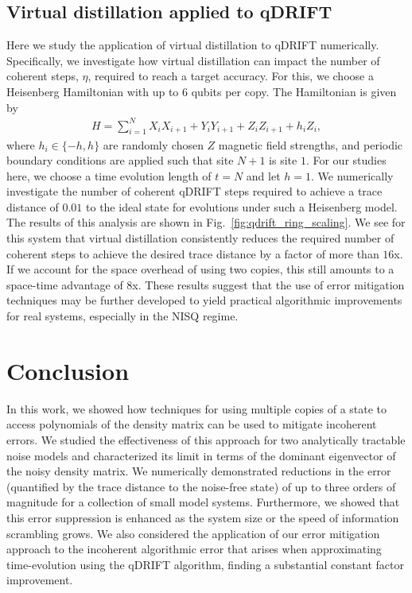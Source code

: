 \documentclass[
amsmath,
amssymb,
aps,
pra,
reprint,
twocolumn,
superscriptaddress,
longbibliography,
showkeys,
floatfix
]{revtex4-1}
\begin{document}
\subsection{Virtual distillation applied to qDRIFT}\label{sec:qDRIFT}
Here we study the application of virtual distillation to qDRIFT numerically. 
Specifically, we investigate how virtual distillation can impact the number of
coherent steps, $\eta$, required to reach a target accuracy. 
For this, we choose a Heisenberg Hamiltonian with up to 6 qubits per copy. 
The Hamiltonian is given by
\begin{align}
  H = \sum_{i=1}^{N} X_i X_{i+1} + Y_i Y_{i+1} + Z_i Z_{i+1} + h_i Z_i,
\end{align}
where $h_i \in \{-h, h\}$ are randomly chosen $Z$ magnetic field strengths, and
periodic boundary conditions are applied such that site $N+1$ is site $1$. 
For our studies here, we choose a time evolution length of $t=N$ and let $h=1$. 
We numerically investigate the number of coherent qDRIFT steps required to
achieve a trace distance of $0.01$ to the ideal state for evolutions under such
a Heisenberg model. 
The results of this analysis are shown in Fig.~\ref{fig:qdrift_ring_scaling}. 
We see for this system that virtual distillation consistently reduces the
required number of coherent steps to achieve the desired trace distance by a
factor of more than $16$x. 
If we account for the space overhead of using two copies, this still amounts to
a space-time advantage of $8$x. 
These results suggest that the use of error mitigation techniques may be further
developed to yield practical algorithmic improvements for real systems,
especially in the NISQ regime.


\section{Conclusion}

In this work, we showed how techniques for using multiple copies of a state to
access polynomials of the density matrix can be used to mitigate incoherent
errors.
We studied the effectiveness of this approach for two analytically tractable
noise models and characterized its limit in terms of the dominant eigenvector of
the noisy density matrix. 
We numerically demonstrated reductions in the error (quantified by the trace
distance to the noise-free state) of up to three orders of magnitude for a
collection of small model systems. 
Furthermore, we showed that this error suppression is enhanced as the system
size or the speed of information scrambling grows.
We also considered the application of our error mitigation approach to the
incoherent algorithmic error that arises when approximating time-evolution using
the qDRIFT algorithm, finding a substantial constant factor improvement.
\end{document}
